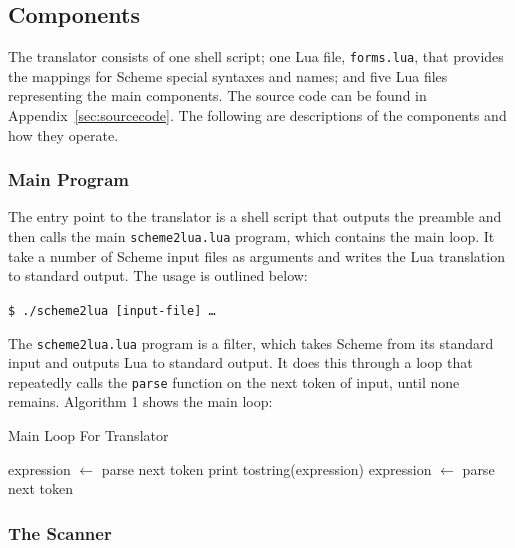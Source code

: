\subsection{Components}

The translator consists of one shell script; one Lua file, \texttt{forms.lua},
that provides the mappings for Scheme special syntaxes and names; and five Lua
files representing the main components. The source code can be found in
Appendix~\ref{sec:sourcecode}. The following are descriptions of the components
and how they operate.

\subsubsection{Main Program}

The entry point to the translator is a shell script that outputs the preamble
and then calls the main \texttt{scheme2lua.lua} program, which contains the main
loop. It take a number of Scheme input files as arguments and writes the Lua
translation to standard output. The usage is outlined below:

\begin{framed}
\texttt{\$ ./scheme2lua [input-file] \ldots}
\end{framed}

The \texttt{scheme2lua.lua} program is a filter, which takes Scheme from its
standard input and outputs Lua to standard output. It does this through a loop
that repeatedly calls the \texttt{parse} function on the next token of input,
until none remains. Algorithm 1 shows the main loop:

\begin{algorithm}
\caption{Main Loop For Translator}
\label{alg:mainloop}
\begin{algorithmic}
\STATE expression $\leftarrow$ parse next token  
\STATE print tostring(expression)
\STATE expression $\leftarrow$ parse next token
\ENDWHILE
\end{algorithmic}
\end{algorithm}

\subsubsection{The Scanner}

